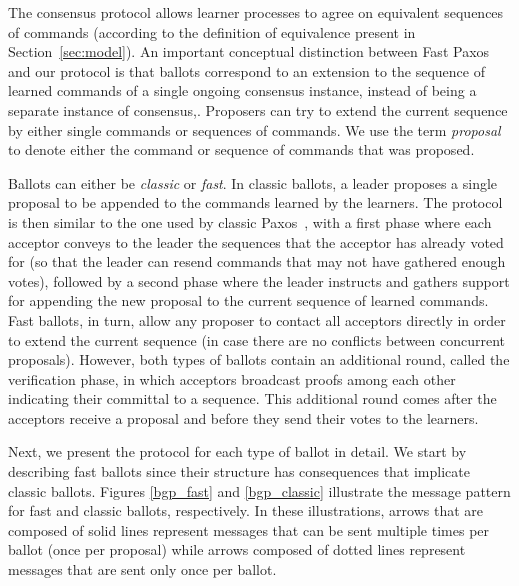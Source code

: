 The consensus protocol allows learner processes to agree on equivalent sequences of commands (according to the definition of equivalence present in Section~\ref{sec:model}). An important conceptual distinction between Fast Paxos~\cite{L06} and our protocol is that ballots correspond to an extension to the sequence of learned commands of a single ongoing consensus instance, instead of being a separate instance of consensus,. Proposers can try to extend the current sequence by either single commands or sequences of commands. We use the term \textit{proposal} to denote either the command or sequence of commands that was proposed.\par
Ballots can either be \textit{classic} or \textit{fast}. In classic ballots, a leader proposes a single proposal to be appended to the commands learned by the learners. The protocol is then similar to the one used by classic Paxos~\cite{Lam98}, with a first phase where each acceptor conveys to the leader the sequences that the acceptor has already voted for (so that the leader can resend commands that may not have gathered enough votes), followed by a second phase where the leader instructs and gathers support for appending the new proposal to the current sequence of learned commands. Fast ballots, in turn, allow any proposer to contact all acceptors directly in order to extend the current sequence (in case there are no conflicts between concurrent proposals). However, both types of ballots contain an additional round, called the verification phase, in which acceptors broadcast proofs among each other indicating their committal to a sequence. This additional round comes after the acceptors receive a proposal and before they send their votes to the learners.\par
Next, we present the protocol for each type of ballot in detail. We start by describing fast ballots since their structure has consequences that implicate classic ballots. Figures \ref{bgp_fast} and \ref{bgp_classic} illustrate the message pattern for fast and classic ballots, respectively. In these illustrations, arrows that are composed of solid lines represent messages that can be sent multiple times per ballot (once per proposal) while arrows composed of dotted lines represent messages that are sent only once per ballot.

